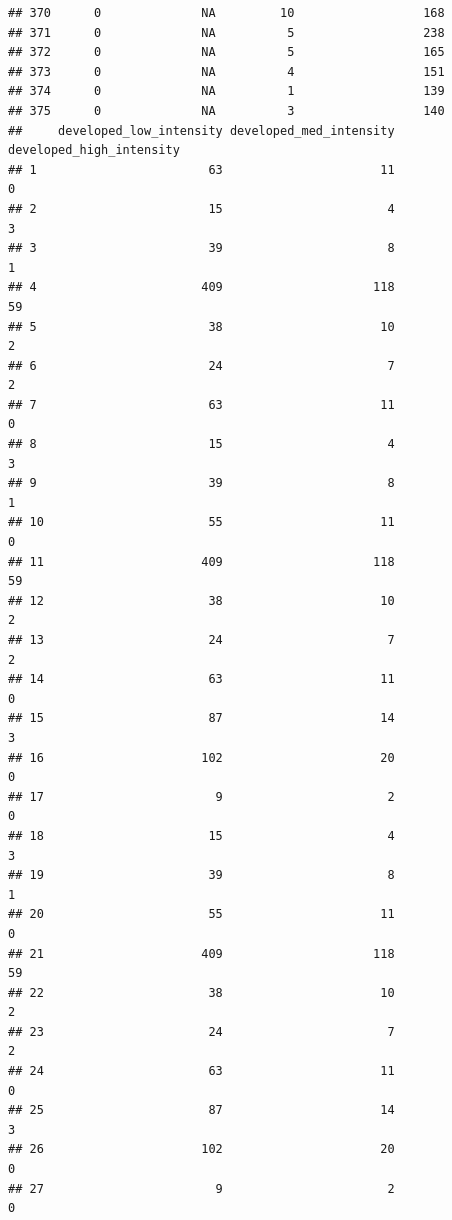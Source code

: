 \documentclass[
]{article}
\begin{document}
\begin{verbatim}
## 370      0              NA         10                  168
## 371      0              NA          5                  238
## 372      0              NA          5                  165
## 373      0              NA          4                  151
## 374      0              NA          1                  139
## 375      0              NA          3                  140
##     developed_low_intensity developed_med_intensity developed_high_intensity
## 1                        63                      11                        0
## 2                        15                       4                        3
## 3                        39                       8                        1
## 4                       409                     118                       59
## 5                        38                      10                        2
## 6                        24                       7                        2
## 7                        63                      11                        0
## 8                        15                       4                        3
## 9                        39                       8                        1
## 10                       55                      11                        0
## 11                      409                     118                       59
## 12                       38                      10                        2
## 13                       24                       7                        2
## 14                       63                      11                        0
## 15                       87                      14                        3
## 16                      102                      20                        0
## 17                        9                       2                        0
## 18                       15                       4                        3
## 19                       39                       8                        1
## 20                       55                      11                        0
## 21                      409                     118                       59
## 22                       38                      10                        2
## 23                       24                       7                        2
## 24                       63                      11                        0
## 25                       87                      14                        3
## 26                      102                      20                        0
## 27                        9                       2                        0

\end{verbatim}
\end{document}
